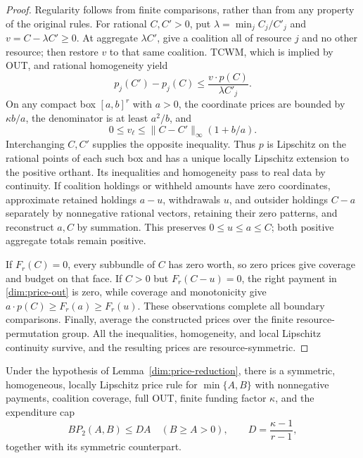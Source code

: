 \begin{proof}
Regularity follows from finite comparisons, rather than from any property
of the original rules. For rational $C,C'>0$, put
$\lambda=\min_j C_j/C'_j$ and $v=C-\lambda C'\ge0$.
At aggregate $\lambda C'$, give a coalition all of resource $j$ and no
other resource; then restore $v$ to that same coalition. TCWM, which is
implied by OUT, and rational homogeneity yield
\begin{equation}\label{dim:relative-comparison}
 p_j(C')-p_j(C)
 \le\frac{v\cdot p(C)}{\lambda C'_j}.
\end{equation}
On any compact box $[a,b]^r$ with $a>0$, the coordinate prices are bounded
by $\kappa b/a$, the denominator is at least $a^2/b$, and
\[
 0\le v_\ell\le\|C-C'\|_\infty(1+b/a).
\]
Interchanging $C,C'$ supplies the opposite inequality. Thus $p$ is
Lipschitz on the rational points of each such box and has a unique locally
Lipschitz extension to the positive orthant. Its inequalities and
homogeneity pass to real data by continuity. If coalition holdings or
withheld amounts have zero coordinates, approximate retained holdings $a-u$, withdrawals $u$, and outsider
holdings $C-a$ separately by nonnegative rational vectors, retaining their zero
patterns, and reconstruct $a,C$ by summation. This preserves
$0\le u\le a\le C$; both positive aggregate totals remain positive.

If $F_r(C)=0$, every subbundle of $C$ has zero worth, so zero prices give
coverage and budget on that face. If $C>0$ but $F_r(C-u)=0$, the right
payment in \eqref{dim:price-out} is zero, while coverage and monotonicity
give $a\cdot p(C)\ge F_r(a)\ge F_r(u)$.
These observations complete all boundary comparisons. Finally, average
the constructed prices over the finite resource-permutation group.
All the inequalities, homogeneity, and local Lipschitz continuity survive,
and the resulting prices are resource-symmetric.
\end{proof}

\begin{lemma}\label{dim:pair-limit}
Under the hypothesis of Lemma~\ref{dim:price-reduction}, there is a
symmetric, homogeneous, locally Lipschitz price rule for $\min\{A,B\}$
with nonnegative payments, coalition coverage, full OUT, finite funding
factor $\kappa$, and the expenditure cap
\begin{equation}\label{dim:pair-cap}
 B P_2(A,B)\le D A\quad(B\ge A>0),
 \qquad D=\frac{\kappa-1}{r-1},
\end{equation}
together with its symmetric counterpart.
\end{lemma}

